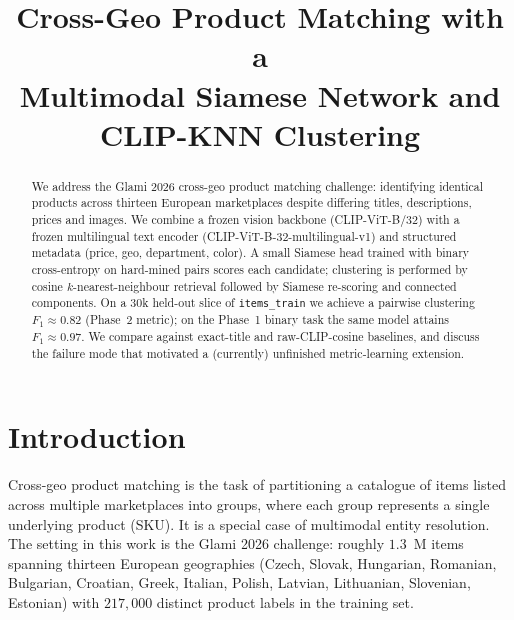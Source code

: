 \documentclass[10pt,conference]{IEEEtran}
\begin{document}
\title{Cross-Geo Product Matching with a\\Multimodal Siamese Network and CLIP-KNN Clustering}

\author{
}

\maketitle

\begin{abstract}
We address the Glami 2026 cross-geo product matching challenge: identifying
identical products across thirteen European marketplaces despite differing
titles, descriptions, prices and images. We combine a frozen vision backbone
(CLIP-ViT-B/32) with a frozen multilingual text encoder
(CLIP-ViT-B-32-multilingual-v1) and structured metadata (price, geo,
department, color). A small Siamese head trained with binary cross-entropy on
hard-mined pairs scores each candidate; clustering is performed by cosine
$k$-nearest-neighbour retrieval followed by Siamese re-scoring and connected
components. On a 30k held-out slice of \texttt{items\_train} we achieve a
pairwise clustering $F_1 \approx 0.82$ (Phase~2 metric); on the Phase~1
binary task the same model attains $F_1 \approx 0.97$. We compare against
exact-title and raw-CLIP-cosine baselines, and discuss the failure mode that
motivated a (currently) unfinished metric-learning extension.
\end{abstract}

\section{Introduction}
\label{sec:intro}

Cross-geo product matching is the task of partitioning a catalogue of items
listed across multiple marketplaces into groups, where each group represents
a single underlying product (SKU). It is a special case of multimodal entity
resolution. The setting in this work is the Glami 2026 challenge: roughly
$1.3$~M items spanning thirteen European geographies (Czech, Slovak,
Hungarian, Romanian, Bulgarian, Croatian, Greek, Italian, Polish, Latvian,
Lithuanian, Slovenian, Estonian) with $217{,}000$ distinct product labels in
the training set.
\end{document}
